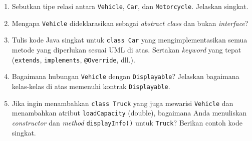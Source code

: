 \documentclass[10pt,openany,a4paper]{article}
\begin{document}
\begin{enumerate}
    \vspace{2mm}
    \begin{enumerate}[label=(\alph*)]
        \item Sebutkan tipe relasi antara \texttt{Vehicle}, \texttt{Car}, dan \texttt{Motorcycle}. Jelaskan singkat.\vspace{2mm}
        \item Mengapa \texttt{Vehicle} dideklarasikan sebagai \textit{abstract class} dan bukan \textit{interface}?\vspace{2mm}
        \item Tulis kode Java singkat untuk \texttt{class Car} yang mengimplementasikan semua metode yang diperlukan sesuai UML di atas. Sertakan \textit{keyword} yang tepat (\texttt{extends}, \texttt{implements}, \texttt{@Override}, dll.).\vspace{2mm}
        \item Bagaimana hubungan \texttt{Vehicle} dengan \texttt{Displayable}? Jelaskan bagaimana kelas-kelas di atas memenuhi kontrak \texttt{Displayable}.\vspace{2mm}
        \item Jika ingin menambahkan \texttt{class Truck} yang juga mewarisi \texttt{Vehicle} dan menambahkan atribut \texttt{loadCapacity} (double), bagaimana Anda menuliskan \textit{constructor} dan \textit{method} \texttt{displayInfo()} untuk \texttt{Truck}? Berikan contoh kode singkat.\vspace{2mm}
    \end{enumerate}
\end{enumerate}
\end{document}
